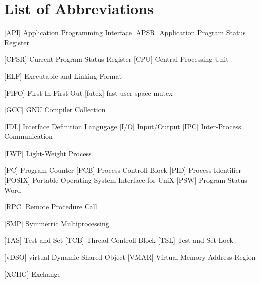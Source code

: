 
\chapter*{List of Abbreviations}

\begin{acronym} [POSIX]
 [API] {Application Programming Interface}
     [APSR] {Application Program Status Register}

 [CPSR] {Current Program Status Register}
 [CPU] {Central Processing Unit}


 [ELF] {Executable and Linking Format}

 [FIFO] {First In First Out}
 [futex] {fast user-space mutex}

 [GCC] {GNU Compiler Collection}


 [IDL] {Interface Definition Langugage}
 [I/O] {Input/Output}
[IPC] {Inter-Process Communication}



 [LWP] {Light-Weight Process}




 [PC] {Program Counter}
 [PCB] {Process Controll Block}
 [PID] {Process Identifier}
 [POSIX] {Portable Operating System Interface for UniX}
 [PSW] {Program Status Word}


     [RPC] {Remote Procedure Call}

 [SMP] {Symmetric Multiprocessing}

 [TAS] {Test and Set}
 [TCB] {Thread Controll Block}
 [TSL] {Test and Set Lock}


 [vDSO] {virtual Dynamic Shared Object}
 [VMAR] {Virtual Memory Address Region}


 [XCHG] {Exchange}



\end{acronym} 
